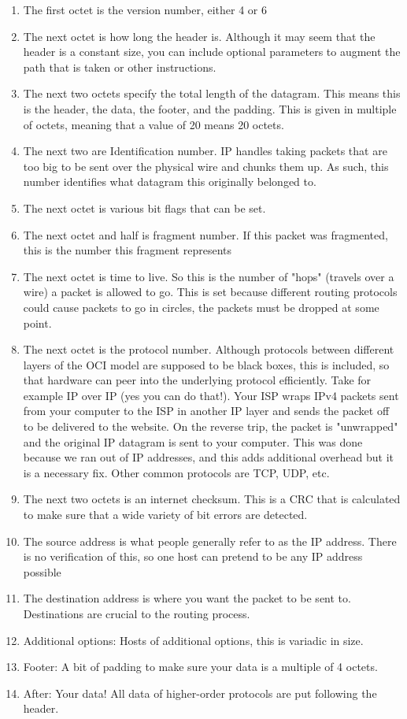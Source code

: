 \begin{enumerate}
  \item The first octet is the version number, either 4 or 6
  \item The next octet is how long the header is.
    Although it may seem that the header is a constant size, you can include optional parameters to augment the path that is taken or other instructions.
  \item The next two octets specify the total length of the datagram.
    This means this is the header, the data, the footer, and the padding.
    This is given in multiple of octets, meaning that a value of 20 means 20 octets.
  \item The next two are Identification number.
    IP handles taking packets that are too big to be sent over the physical wire and chunks them up.
    As such, this number identifies what datagram this originally belonged to.
  \item The next octet is various bit flags that can be set.
  \item The next octet and half is fragment number.
    If this packet was fragmented, this is the number this fragment represents
  \item The next octet is time to live.
    So this is the number of "hops" (travels over a wire) a packet is allowed to go.
    This is set because different routing protocols could cause packets to go in circles, the packets must be dropped at some point.
  \item The next octet is the protocol number.
    Although protocols between different layers of the OCI model are supposed to be black boxes, this is included, so that hardware can peer into the underlying protocol efficiently.
    Take for example IP over IP (yes you can do that!).
    Your ISP wraps IPv4 packets sent from your computer to the ISP in another IP layer and sends the packet off to be delivered to the website.
    On the reverse trip, the packet is "unwrapped" and the original IP datagram is sent to your computer.
    This was done because we ran out of IP addresses, and this adds additional overhead but it is a necessary fix.
    Other common protocols are TCP, UDP, etc.
  \item The next two octets is an internet checksum.
    This is a CRC that is calculated to make sure that a wide variety of bit errors are detected.
  \item The source address is what people generally refer to as the IP address.
    There is no verification of this, so one host can pretend to be any IP address possible
  \item The destination address is where you want the packet to be sent to.
    Destinations are crucial to the routing process.
  \item Additional options: Hosts of additional options, this is variadic in size.
  \item Footer: A bit of padding to make sure your data is a multiple of 4 octets.
  \item After: Your data! All data of higher-order protocols are put following the header.
\end{enumerate}

